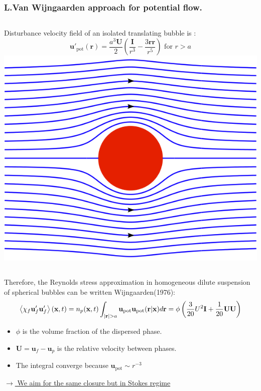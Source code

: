 \documentclass{sintefbeamer}
\begin{document}
\begin{frame}
  \frametitle{L.Van Wijngaarden approach for potential flow.}

  \begin{columns}
Disturbance velocity field of an isolated translating bubble is :
\begin{equation*}
  \textbf{u}'_\text{pot}(\textbf{r})
  = \frac{a^3 \textbf{U}}{2}\left(\frac{\textbf{I}}{r^3} - \frac{3 \textbf{rr}}{r^5}\right)
  \text{    for    }r>a
\end{equation*}
\includegraphics[width=\textwidth,angle=90]{image/Potential_cylinder.png}
\end{columns}
\pause
Therefore, the Reynolds stress approximation in homogeneous dilute suspension of spherical bubbles can be written Wijngaarden(1976): 
  \begin{align*}
    \left<\chi_f \textbf{u}'_f\textbf{u}'_f\right>(\textbf{x},t)
    =
    n_p(\textbf{x},t)
      \int_{|\textbf{r}| > a }
       \textbf{u}_\text{pot}\textbf{u}_\text{pot}(\textbf{r}|\textbf{x}) d\textbf{r}
    = \phi \left(\frac{3}{20} U^2\textbf{I} + \frac{1}{20}\textbf{UU} \right)
\end{align*}

  \begin{itemize}
    \item $\phi$ is the volume fraction of the dispersed phase. 
    \item $\textbf{U} = \textbf{u}_f-\textbf{u}_p$ is the relative velocity between phases. 
    \item The integral converge because $\textbf{u}_\text{pot}  \sim r^{-3}$
  \end{itemize}
  \underline{$\to$ We aim for the same closure but in Stokes regime}
\end{frame}
\end{document}
